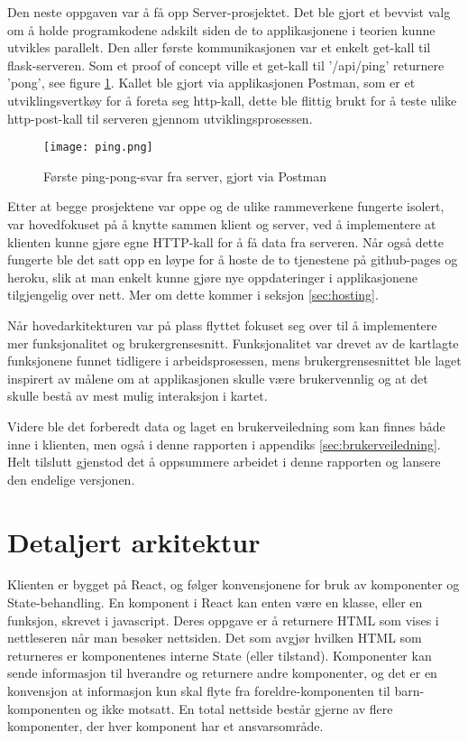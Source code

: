 Den neste oppgaven var å få opp Server-prosjektet. Det ble gjort et bevvist valg om å holde programkodene adskilt siden de to applikasjonene i teorien kunne utvikles parallelt. Den aller første kommunikasjonen var et enkelt get-kall til flask-serveren. Som et proof of concept ville et get-kall til '/api/ping' returnere 'pong', see figure \ref{fig:firstping}. Kallet ble gjort via applikasjonen Postman, som er et utviklingsvertkøy for å foreta seg http-kall, dette ble flittig brukt for å teste ulike http-post-kall til serveren gjennom utviklingsprosessen.  

\begin{figure}[h]
    \center
    \texttt{[image: ping.png]}
    \caption{Første ping-pong-svar fra server, gjort via Postman}
    \label{fig:firstping}
\end{figure}

Etter at begge prosjektene var oppe og de ulike rammeverkene fungerte isolert, var hovedfokuset på å knytte sammen klient og server, ved å implementere at klienten kunne gjøre egne HTTP-kall for å få data fra serveren. Når også dette fungerte ble det satt opp en løype for å hoste de to tjenestene på github-pages og heroku, slik at man enkelt kunne gjøre nye oppdateringer i applikasjonene tilgjengelig over nett. Mer om dette kommer i seksjon \ref{sec:hosting}.

Når hovedarkitekturen var på plass flyttet fokuset seg over til å implementere mer funksjonalitet og brukergrensesnitt. Funksjonalitet var drevet av de kartlagte funksjonene funnet tidligere i arbeidsprosessen, mens brukergrensesnittet ble laget inspirert av målene om at applikasjonen skulle være brukervennlig og at det skulle bestå av mest mulig interaksjon i kartet. 

Videre ble det forberedt data og laget en brukerveiledning som kan finnes både inne i klienten, men også i denne rapporten i appendiks \ref{sec:brukerveiledning}. Helt tilslutt gjenstod det å oppsummere arbeidet i denne rapporten og lansere den endelige versjonen. 

\section{Detaljert arkitektur}

Klienten er bygget på React, og følger konvensjonene for bruk av komponenter og State-behandling. En komponent i React kan enten være en klasse, eller en funksjon, skrevet i javascript. Deres oppgave er å returnere HTML som vises i nettleseren når man besøker nettsiden. Det som avgjør hvilken HTML som returneres er komponentenes interne State (eller tilstand). Komponenter kan sende informasjon til hverandre og returnere andre komponenter, og det er en konvensjon at informasjon kun skal flyte fra foreldre-komponenten til barn-komponenten og ikke motsatt. En total nettside består gjerne av flere komponenter, der hver komponent har et ansvarsområde.

